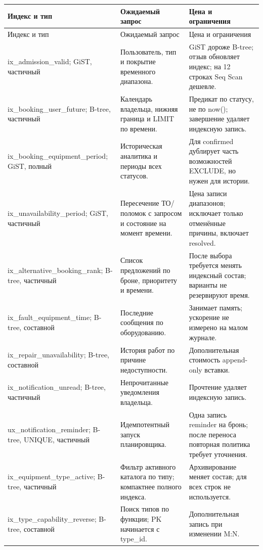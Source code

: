 \begin{singlespace}\small
\begin{longtable}{>{\raggedright\arraybackslash}p{}>{\raggedright\arraybackslash}p{}>{\raggedright\arraybackslash}p{}}
\toprule Индекс и тип & Ожидаемый запрос & Цена и ограничения\\\midrule\endfirsthead
\toprule Индекс и тип & Ожидаемый запрос & Цена и ограничения\\\midrule\endhead
ix\_\allowbreak{}admission\_\allowbreak{}valid; GiST, частичный & Пользователь, тип и покрытие временного диапазона. & GiST дороже B-tree; отзыв обновляет индекс; на 12 строках Seq Scan дешевле. \\
ix\_\allowbreak{}booking\_\allowbreak{}user\_\allowbreak{}future; B-tree, частичный & Календарь владельца, нижняя граница и LIMIT по времени. & Предикат по статусу, не по now(); завершение удаляет индексную запись. \\
ix\_\allowbreak{}booking\_\allowbreak{}equipment\_\allowbreak{}period; GiST, полный & Историческая аналитика и периоды всех статусов. & Для confirmed дублирует часть возможностей EXCLUDE, но нужен для истории. \\
ix\_\allowbreak{}unavailability\_\allowbreak{}period; GiST, частичный & Пересечение ТО/\allowbreak{}поломок с запросом и состояние на момент времени. & Цена записи диапазонов; исключает только отменённые причины, включает resolved. \\
ix\_\allowbreak{}alternative\_\allowbreak{}booking\_\allowbreak{}rank; B-tree, частичный & Список предложений по броне, приоритету и времени. & После выбора требуется менять индексный состав; варианты не резервируют время. \\
ix\_\allowbreak{}fault\_\allowbreak{}equipment\_\allowbreak{}time; B-tree, составной & Последние сообщения по оборудованию. & Занимает память; ускорение не измерено на малом журнале. \\
ix\_\allowbreak{}repair\_\allowbreak{}unavailability; B-tree, составной & История работ по причине недоступности. & Дополнительная стоимость append-only вставки. \\
ix\_\allowbreak{}notification\_\allowbreak{}unread; B-tree, частичный & Непрочитанные уведомления владельца. & Прочтение удаляет индексную запись. \\
ux\_\allowbreak{}notification\_\allowbreak{}reminder; B-tree, UNIQUE, частичный & Идемпотентный запуск планировщика. & Одна запись reminder на бронь; после переноса повторная политика требует уточнения. \\
ix\_\allowbreak{}equipment\_\allowbreak{}type\_\allowbreak{}active; B-tree, частичный & Фильтр активного каталога по типу; компактнее полного индекса. & Архивирование меняет состав; для всех строк не используется. \\
ix\_\allowbreak{}type\_\allowbreak{}capability\_\allowbreak{}reverse; B-tree, составной & Поиск типов по функции; PK начинается с type\_\allowbreak{}id. & Дополнительная запись при изменении M:N. \\
\bottomrule\end{longtable}\end{singlespace}
